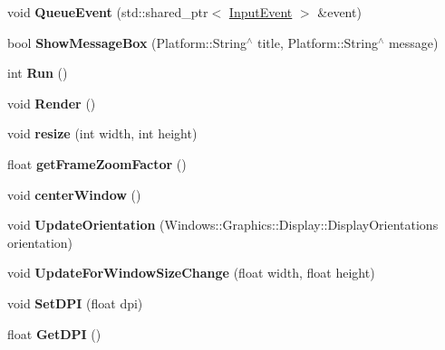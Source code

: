 \begin{DoxyCompactItemize}
\mbox{\label{classGLViewImpl_ae40958ea2c778cbcdb8a9ca7f5f5be04}} 
void {\bfseries Queue\+Event} (std\+::shared\+\_\+ptr$<$ \hyperlink{classInputEvent}{Input\+Event} $>$ \&event)
\item 
\mbox{\label{classGLViewImpl_a7e9226ce786cd45c1df8ddfb9bcac34b}} 
bool {\bfseries Show\+Message\+Box} (Platform\+::\+String$^\wedge$ title, Platform\+::\+String$^\wedge$ message)
\item 
\mbox{\label{classGLViewImpl_a11bbfff225021f936218bb789e55766c}} 
int {\bfseries Run} ()
\item 
\mbox{\label{classGLViewImpl_a6292248311f86c79754e2d48e1f60416}} 
void {\bfseries Render} ()
\item 
\mbox{\label{classGLViewImpl_a9fd6d9d55d9567665caea22bd738d989}} 
void {\bfseries resize} (int width, int height)
\item 
\mbox{\label{classGLViewImpl_a7c62d8d733881a5261f9c21565819e1b}} 
float {\bfseries get\+Frame\+Zoom\+Factor} ()
\item 
\mbox{\label{classGLViewImpl_a83c0d6f298fca360b2f89ccc5a4bf075}} 
void {\bfseries center\+Window} ()
\item 
\mbox{\label{classGLViewImpl_a3f793604e3211052e26a311c61c426b2}} 
void {\bfseries Update\+Orientation} (Windows\+::\+Graphics\+::\+Display\+::\+Display\+Orientations orientation)
\item 
\mbox{\label{classGLViewImpl_ac1468140fd28b2608d5df7e6d7d5233e}} 
void {\bfseries Update\+For\+Window\+Size\+Change} (float width, float height)
\item 
\mbox{\label{classGLViewImpl_a9d2e1947bf7e2b1f8334206cd82c61a5}} 
void {\bfseries Set\+D\+PI} (float dpi)
\item 
\mbox{\label{classGLViewImpl_aa23b54da982bee694523fc93fbac71c0}} 
float {\bfseries Get\+D\+PI} ()
\item 

\end{DoxyCompactItemize}
